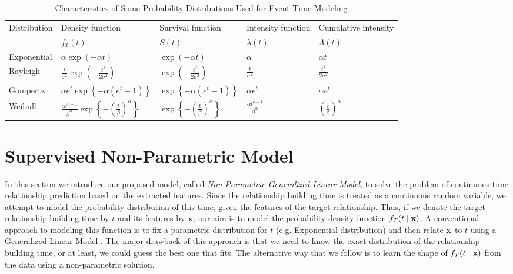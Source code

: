 \begin{table*}
    \centering
    \caption{Characteristics of Some Probability Distributions Used for Event-Time Modeling}
    \label{table:dists}
    \footnotesize
    \begin{tabu} to \textwidth {X X[c] X[c] X[c] X[c]}
        \toprule
        Distribution & Density function & Survival function & Intensity function & Cumulative intensity\\
        & $f_T(t)$ & $S(t)$ & $\lambda(t)$ & $\Lambda(t)$\\[1pt]
        \midrule %
        Exponential & $\alpha\exp(-\alpha t)$ & $\exp(-\alpha t)$ & $\alpha$ & $\alpha t$\\[4pt]
        Rayleigh & $\frac{t}{\sigma^2}\exp(-\frac{t^2}{2\sigma^2})$ & $\exp(-\frac{t^2}{2\sigma^2})$ & $\frac{t}{\sigma^2}$ & $\frac{t^2}{2\sigma^2}$\\[4pt]
        Gompertz & $\alpha e^t\exp\left\lbrace -\alpha(e^t-1) \right\rbrace$ & $\exp\left\lbrace -\alpha(e^t-1) \right\rbrace$ & $\alpha e^t$ & $\alpha e^t$\\[4pt]
        Weibull & $\frac{\alpha t^{\alpha-1}}{\beta^\alpha}\exp\left\lbrace-(\frac{t}{\beta})^\alpha\right\rbrace$ & $\exp\left\lbrace-(\frac{t}{\beta})^\alpha\right\rbrace$ & $\frac{\alpha t^{\alpha-1}}{\beta^\alpha}$ & $(\frac{t}{\beta})^\alpha$\\[2pt]
        \bottomrule %
    \end{tabu}
\end{table*}

\section{Supervised Non-Parametric Model}\label{sec:method}
In this section we introduce our proposed model, called \emph{Non-Parametric Generalized Linear Model}, to solve the problem of continuous-time relationship prediction based on the extracted features. 
Since the relationship building time is treated as a continuous random variable, we attempt to model the probability distribution of this time, given the features of the target relationship. Thus, if we denote the target relationship building time by $t$ and its features by $\mathbf{x}$, our aim is to model the probability density function $f_T(t\mid \mathbf{x})$. A conventional approach to modeling this function is to fix a parametric distribution for $t$ (e.g. Exponential distribution) and then relate $\mathbf{x}$ to $t$ using a Generalized Linear Model \cite{sun2012will}. The major drawback of this approach is that we need to know the exact distribution of the relationship building time, or at least, we could guess the best one that fits. The alternative way that we follow is to learn the shape of $f_T(t\mid \mathbf{x})$ from the data using a non-parametric solution.

